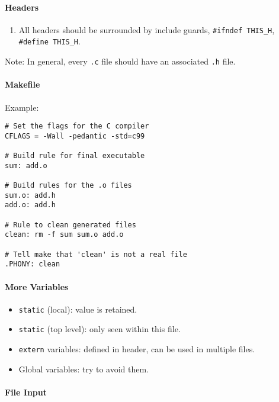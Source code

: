 \documentclass[twocolumn,english]{article}
\begin{document}
\paragraph{Headers}\label{headers}

\begin{enumerate}
\def\labelenumi{\arabic{enumi}.}

\item
  All headers should be surrounded by include guards,
  \texttt{\#ifndef\ THIS\_H}, \texttt{\#define\ THIS\_H}.
\end{enumerate}

Note: In general, every \texttt{.c} file should have an associated
\texttt{.h} file.

\paragraph{Makefile}\label{makefile}

Example:

\begin{verbatim}
# Set the flags for the C compiler
CFLAGS = -Wall -pedantic -std=c99

# Build rule for final executable
sum: add.o

# Build rules for the .o files
sum.o: add.h
add.o: add.h

# Rule to clean generated files
clean: rm -f sum sum.o add.o

# Tell make that 'clean' is not a real file
.PHONY: clean
\end{verbatim}

\paragraph{More Variables}\label{more-variables}

\begin{itemize}

\item
  \texttt{static} (local): value is retained.
\item
  \texttt{static} (top level): only seen within this file.
\item
  \texttt{extern} variables: defined in header, can be used in multiple
  files.
\item
  Global variables: try to avoid them.
\end{itemize}

\paragraph{File Input}\label{file-input}
\end{document}
